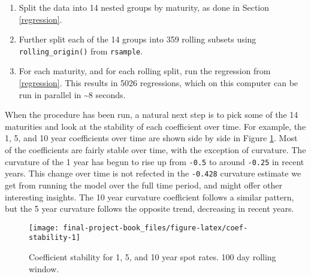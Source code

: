 \documentclass[openany]{book}
\providecommand{\tightlist}{%
  \setlength{\itemsep}{0pt}\setlength{\parskip}{0pt}}
\theoremstyle{definition}
\theoremstyle{definition}
\theoremstyle{definition}
\theoremstyle{remark}
\begin{document}
\begin{enumerate}
\def\labelenumi{\arabic{enumi})}
\tightlist
\item
  Split the data into 14 nested groups by maturity, as done in Section
  \ref{regression}.
\item
  Further split each of the 14 groups into 359 rolling subsets using
  \texttt{rolling\_origin()} from \texttt{rsample}.
\item
  For each maturity, and for each rolling split, run the regression from
  \ref{regression}. This results in 5026 regressions, which on this
  computer can be run in parallel in \textasciitilde{}8 seconds.
\end{enumerate}

\small

\normalsize

\small

\normalsize

\small

\normalsize

When the procedure has been run, a natural next step is to pick some of
the 14 maturities and look at the stability of each coefficient over
time. For example, the 1, 5, and 10 year coefficients over time are
shown side by side in Figure \ref{fig:coef-stability}. Most of the
coefficients are fairly stable over time, with the exception of
curvature. The curvature of the 1 year has begun to rise up from
\texttt{-0.5} to around \texttt{-0.25} in recent years. This change over
time is not refected in the \texttt{-0.428} curvature estimate we get
from running the model over the full time period, and might offer other
interesting insights. The 10 year curvature coefficient follows a
similar pattern, but the 5 year curvature follows the opposite trend,
decreasing in recent years.

\small

\normalsize

\small

\begin{figure}[H]

{\centering \texttt{[image: final-project-book\_files/figure-latex/coef-stability-1]} 

}

\caption{Coefficient stability for 1, 5, and 10 year spot rates. 100 day rolling window.}\label{fig:coef-stability}
\end{figure}

\normalsize

\small
\end{document}
